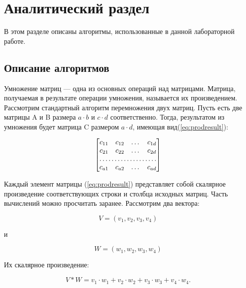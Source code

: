 \documentclass[12pt,a4paper]{scrartcl}
\begin{document}
\newpage
\section{Аналитический раздел}
\label{sec:analitics}

В этом разделе описаны алгоритмы, использованные в данной лабораторной работе.

\subsection{Описание алгоритмов}
\label{sec:analitics:alg}

Умножение матриц — одна из основных операций над матрицами.
Матрица, получаемая в результате операции умножения, называется их произведением. 
Рассмотрим стандартный алгоритм перемножения двух матриц.
Пусть есть две матрицы A и B размера $a\cdot b$ и $c\cdot d$ соответственно. 
Тогда, результатом из умножения будет матрица C размером $a\cdot d$, имеющая вид(\ref{eq:prodresult}):

\begin{equation}\label{eq:prodresult}
\begin{bmatrix}
 c_{11} & c_{12} & \dots & c_{1d} \\
 c_{21} & c_{22} & \dots & c_{2d} \\
 \hdotsfor{4}\\
 c_{a1} & c_{a2} & \dots & c_{ad} \\
\end{bmatrix}
\end{equation}


Каждый элемент матрицы (\ref{eq:prodresult}) представляет собой скалярное произведение соответствующих строки и столбца исходных матриц. 
Часть вычислений можно просчитать заранее. 
Рассмотрим два вектора: 

\begin{equation}\label{eq:vector1}
V = (v_1, v_2, v_3, v_4)
\end{equation}

и

\begin{equation}\label{eq:vector2}
W = (w_1, w_2, w_3, w_4)
\end{equation}


Их скалярное произведение: 

\begin{equation}\label{eq:scalar1}
V * W = v_1 \cdot w_1 + v_2 \cdot w_2 + v_3 \cdot w_3 + v_4 \cdot w_4.
\end{equation}
\end{document}
